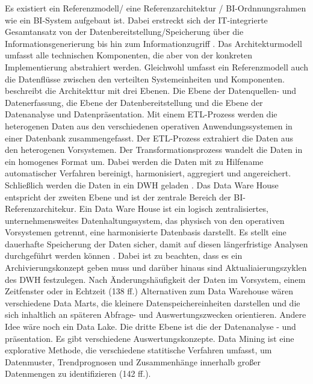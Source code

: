 Es existiert ein Referenzmodell/ eine Referenzarchitektur / BI-Ordnnungsrahmen wie ein \acrshort{BI}-System aufgebaut ist.
Dabei erstreckt sich der IT-integrierte Gesamtansatz von der Datenbereitstellung/Speicherung über die Informationsgenerierung bis hin zum Informationzugriff
\cite[vgl.][8]{kemper_business_2010}.
Das Architekturmodell umfasst alle technischen Komponenten, die aber von der konkreten Implementierung abstrahiert werden.
Gleichwohl umfasst ein Referenzmodell auch die Datenflüsse zwischen den verteilten Systemeinheiten und Komponenten\cite[vgl.][126 ff.]{linden_geschaftsmodellbasierte_2016}. 
 beschreibt die Architekttur mit drei Ebenen. Die Ebene der Datenquellen- und Datenerfassung, die Ebene der Datenbereitstellung und die Ebene der Datenanalyse und Datenpräsentation.
Mit einem ETL-Prozess werden die heterogenen Daten aus den verschiedenen operativen Anwendungssystemen in einer Datenbank zusammengefasst.
Der ETL-Prozess extrahiert die Daten aus den heterogenen Vorsystemen. Der Transformationsprozess wandelt die Daten in ein homogenes Format um. Dabei werden die Daten mit zu Hilfename automatischer Verfahren bereinigt, harmonisiert, aggregiert und angereichert. Schließlich werden die Daten in ein \acrshort{DWH} geladen \cite[vgl.][129 ff.]{linden_geschaftsmodellbasierte_2016}. 
Das Data Ware House entspricht der zweiten Ebene und ist der zentrale Bereich der BI-Referenzarchitekur. Ein Data Ware House ist ein logisch zentralisiertes, unternehmensweites Datenhaltungssystem, das physisch von den operativen Vorsystemen getrennt, eine harmonisierte Datenbasis darstellt. Es stellt eine dauerhafte Speicherung der Daten sicher, damit auf diesen längerfristige Analysen durchgeführt werden können \cite[vgl.][135 ff.]{linden_geschaftsmodellbasierte_2016}.
Dabei ist zu beachten, dass es ein Archivierungskonzept geben muss und darüber hinaus sind Aktualiaierungszyklen des \acrshort{DWH} festzulegen. Nach Änderungshäufigkeit der Daten im Vorsystem, einem Zeitfenster oder in Echtzeit (138 ff.)
Alternativen zum Data Warehouse wären verschiedene Data Marts, die kleinere Datenspeichereinheiten darstellen und die sich inhaltlich an späteren Abfrage- und Auswertungszwecken orientieren. Andere Idee wäre noch ein Data Lake.
Die dritte Ebene ist die der Datenanalyse - und präsentation. Es gibt verschiedene Auswertungskonzepte. Data Mining ist eine explorative Methode, die verschiedene statitische Verfahren umfasst, um Datenmuster, Trendprognosen und Zusammenhänge innerhalb großer Datenmengen zu identifizieren (142 ff.).
